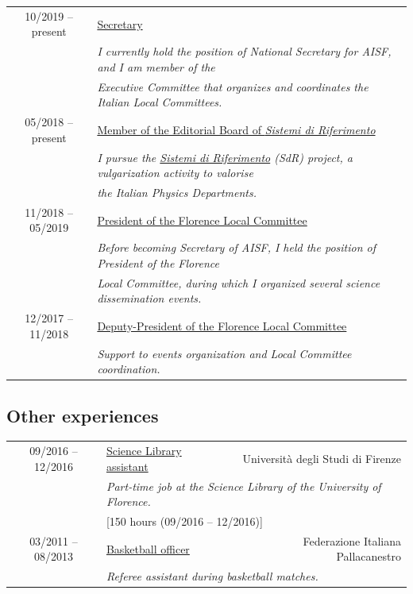 \documentclass[a4paper, 11pt, notitlepage]{article}
\begin{document}
\begin{tabular}{cl}
    {\small 10/2019 -- present} & \ul{Secretary}\\
    & {\small \emph {I currently hold the position of National Secretary for AISF, and I am member of the}}\\
    & {\small \emph {Executive Committee that organizes and coordinates the Italian Local Committees.}}\\ [3mm]
    
    {\small 05/2018 -- present} & \ul{Member of the Editorial Board of \emph{Sistemi di Riferimento}}\\
    & {\small \emph {I pursue the \href{http://ai-sf.it/sistemidiriferimento/}{Sistemi di Riferimento} (SdR) project, a vulgarization activity to valorise}}\\
    & {\small \emph {the Italian Physics Departments.}}\\ [3mm]
                                            
    {\small 11/2018 -- 05/2019} & \ul{President of the Florence Local Committee}\\
    & {\small \emph {Before becoming Secretary of AISF, I held the position of President of the Florence}}\\
    & {\small \emph {Local Committee, during which I organized several science dissemination events.}}\\ [3mm]
                                            
    {\small 12/2017 -- 11/2018} & \ul{Deputy-President of the Florence Local Committee}\\
    & {\small \emph {Support to events organization and Local Committee coordination.}}\\ [3mm]
\end{tabular}

\vskip 6mm

\subsection*{Other experiences}
\begin{tabular*}{\textwidth}{cl @{\extracolsep{\fill}} r}
    {\small 09/2016 -- 12/2016} & \ul{Science Library assistant} & {\small Università degli Studi di Firenze}\\
    & \multicolumn{2}{l}{\small \emph {Part-time job at the Science Library of the University of Florence.}}\\
    & \multicolumn{2}{l}{\small [150 hours (09/2016 -- 12/2016)]}\\ [3 mm]
            
    {\small 03/2011 -- 08/2013} & \ul{Basketball officer} & {\small Federazione Italiana Pallacanestro}\\
    & \multicolumn{2}{l}{\small \emph {Referee assistant during basketball matches.}}\\
\end{tabular*}
\end{document}
